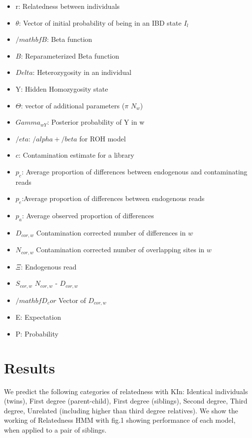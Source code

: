 \documentclass[12pt, letterpaper]{article}
\begin{document}
\begin{itemize}
\item r: Relatedness between individuals
\item $\theta$: Vector of initial probability of being in an IBD state $I_l$
\item $/mathbf{B}$: Beta function
\item $B$: Reparameterized Beta function
\item $Delta$: Heterozygosity in an individual
\item Y: Hidden Homozygosity state
\item $\Theta$: vector of additional parameters ($\pi$ $N_w$)
\item $Gamma_{wY}$: Posterior probability of Y in w
\item $/eta$: $/alpha + /beta$ for ROH model
\item $c$: Contamination estimate for a library
\item $p_c$: Average proportion of differences between endogenous and contaminating reads
\item $p_e$:Average proportion of differences between endogenous reads
\item $p_a$: Average observed proportion of differences
\item $D_{cor,w}$ Contamination corrected number of differences in $w$
\item $N_{cor,w}$ Contamination corrected number of overlapping sites in $w$
\item $\Xi$: Endogenous read
\item $S_{cor,w}$ $N_{cor,w}$ - $D_{cor,w}$
\item $/mathbf{D_cor}$ Vector of $D_{cor,w}$ 
\item E: Expectation
\item P: Probability
\end{itemize}


\section{Results}

We predict the following categories of relatedness with KIn: Identical individuals (twins), First degree (parent-child), First degree (siblings), Second degree, Third degree, Unrelated (including higher than third degree relatives). We show the working of Relatedness HMM with fig.1 showing performance of each model, when applied to a pair of siblings. 
\end{document}
